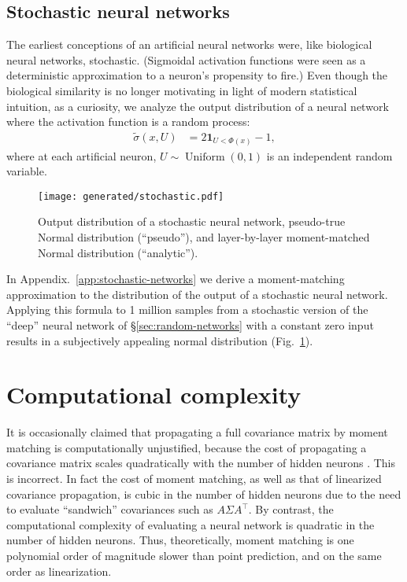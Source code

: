 \documentclass{article}
\begin{document}
\subsection{Stochastic neural networks}
\label{sec:stochastic-networks}
The earliest conceptions of an artificial neural networks were, like biological neural networks, stochastic.
(Sigmoidal activation functions were seen as a deterministic approximation to a neuron's propensity to fire.)
Even though the biological similarity is no longer motivating in light of modern statistical intuition, as a curiosity, we analyze the output distribution of a neural network where the activation function is a random process:
\begin{align}
  \tilde \sigma(x, U) &= 2 \bm{1}_{U < \Phi(x)} - 1,
\end{align}
where at each artificial neuron, \(U \sim \operatorname{Uniform}(0,1)\) is an independent random variable.

\begin{figure}
  \begin{center}
    \texttt{[image: generated/stochastic.pdf]}
  \end{center}
  \caption{\label{fig:stochastic} Output distribution of a stochastic neural network, pseudo-true Normal distribution (``pseudo''), and layer-by-layer moment-matched Normal distribution (``analytic'').}
\end{figure}

In Appendix.~\ref{app:stochastic-networks} we derive a moment-matching approximation to the distribution of the output of a stochastic neural network.
Applying this formula to 1 million samples from a stochastic version of the ``deep'' neural network of \S\ref{sec:random-networks} with a constant zero input results in a subjectively appealing normal distribution (Fig.~\ref{fig:stochastic}).

\section{Computational complexity}
It is occasionally claimed that propagating a full covariance matrix by moment matching is computationally unjustified, because the cost of propagating a covariance matrix scales quadratically with the number of hidden neurons \citep[\S5]{akgul_deterministic_2025}.
This is incorrect.
In fact the cost of moment matching, as well as that of linearized covariance propagation, is cubic in the number of hidden neurons due to the need to evaluate ``sandwich'' covariances such as \(A \Sigma A^\intercal\).
By contrast, the computational complexity of evaluating a neural network is quadratic in the number of hidden neurons.
Thus, theoretically, moment matching is one polynomial order of  magnitude slower than point prediction, and on the same order as linearization.
\end{document}
